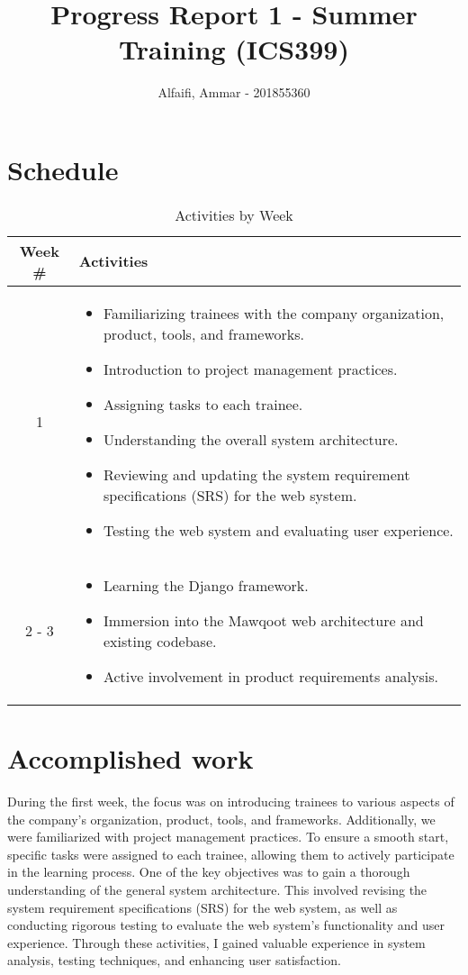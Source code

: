 \documentclass{article}
\title{Progress Report 1 - Summer Training (ICS399)}
\author{Alfaifi, Ammar - 201855360}
\date{}
\begin{document}
\maketitle

\section{Schedule}

\begin{table}[h]
  \centering
  \caption{Activities by Week}
  \begin{tabular}{|c|p{10cm}|}
    \hline
    \textbf{Week \#} & \textbf{Activities}       \\
    \hline
    1                & \begin{itemize}
      \item Familiarizing trainees with the company organization, product, tools, and frameworks.
      \item Introduction to project management practices.
      \item Assigning tasks to each trainee.
      \item Understanding the overall system architecture.
      \item Reviewing and updating the system requirement specifications (SRS) for the web system.
      \item Testing the web system and evaluating user experience.
    \end{itemize} \\
    \hline
    2 - 3            & \begin{itemize}
      \item Learning the Django framework.
      \item Immersion into the Mawqoot web architecture and existing codebase.
      \item Active involvement in product requirements analysis.
    \end{itemize} \\
    \hline
  \end{tabular}
\end{table}

\section{Accomplished work}

During the first week, the focus was on introducing trainees to various aspects of the company's organization, product, tools, and frameworks. Additionally,  we were familiarized with project management practices. To ensure a smooth start, specific tasks were assigned to each trainee, allowing them to actively participate in the learning process. One of the key objectives was to gain a thorough understanding of the general system architecture. This involved revising the system requirement specifications (SRS) for the web system, as well as conducting rigorous testing to evaluate the web system's functionality and user experience. Through these activities, I gained valuable experience in system analysis, testing techniques, and enhancing user satisfaction.
\newline
\end{document}
